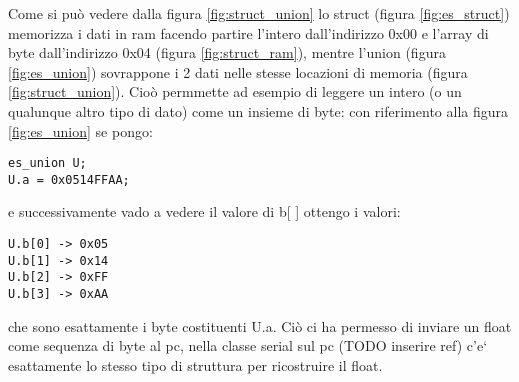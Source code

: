 \documentclass[10pt,a4paper]{article}
\begin{document}
Come si pu\`o vedere dalla figura \ref{fig:struct_union} lo struct (figura \ref{fig:es_struct}) memorizza i dati in ram facendo partire l'intero dall'indirizzo 0x00 e l'array di byte dall'indirizzo 0x04 (figura \ref{fig:struct_ram}), mentre l'union (figura \ref{fig:es_union}) sovrappone i 2 dati nelle stesse locazioni di memoria (figura \ref{fig:struct_union}).
Cio\`o permmette ad esempio di leggere un intero (o un qualunque altro tipo di dato) come un insieme di byte: con riferimento alla figura \ref{fig:es_union} se pongo:
\begin{lstlisting}[style=myArduino, caption=classe "serial", captionpos=b, label={lst:es_union}]
es_union U;
U.a = 0x0514FFAA;
\end{lstlisting}
e successivamente vado a vedere il valore di b[ ] ottengo i valori:
\begin{lstlisting}[style=myoutput, caption=classe "serial", captionpos=b, label={lst:es_union}]
U.b[0] -> 0x05
U.b[1] -> 0x14
U.b[2] -> 0xFF
U.b[3] -> 0xAA
\end{lstlisting}
che sono esattamente i byte costituenti U.a. Ci\`o ci ha permesso di inviare un float come sequenza di byte al pc, nella classe serial sul pc (TODO inserire ref) c'e` esattamente lo stesso tipo di struttura per ricostruire il float. 
\end{document}

